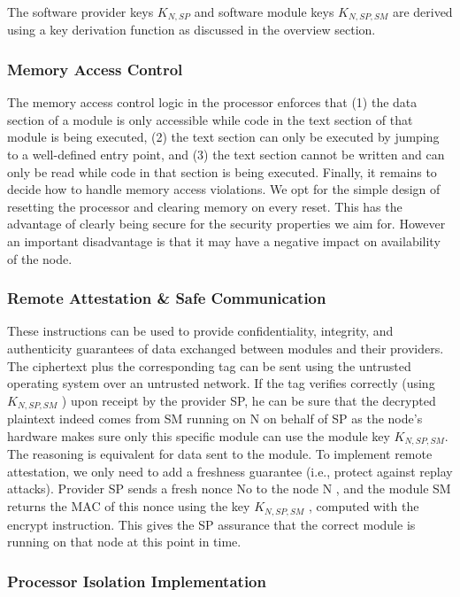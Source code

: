 \documentclass{article}
\begin{document}
The software provider keys $K_{N,SP}$ and software module keys $K_{N,SP,SM}$ are derived using a key derivation function as discussed in the overview section.

\subsubsection{Memory Access Control}

The memory access control logic in the processor enforces that (1) the data section of a module is only accessible while code in the text section of that module is being executed, (2) the text section can only be executed by jumping to a well-defined entry point, and (3) the text section cannot be written and can only be read while code in that section is being executed. Finally, it remains to decide how to handle memory access violations. We opt for the simple design of resetting the processor and clearing memory on every reset. This has the advantage of clearly being secure for the security properties we aim for. However an important disadvantage is that it may have a negative impact on availability of the node.

\subsubsection{Remote Attestation \& Safe Communication}

These instructions can be used to provide confidentiality, integrity, and authenticity guarantees of data exchanged between modules and their providers. The ciphertext plus the corresponding tag can be sent using the untrusted operating system over an untrusted network. If the tag verifies correctly (using $K_{N,SP,SM}$ ) upon receipt by the provider SP, he can be sure that the decrypted plaintext indeed comes from SM running on N on behalf of SP as the node’s hardware makes sure only this specific module can use the module key $K_{N,SP,SM}$. The reasoning is equivalent for data sent to the module. To implement remote attestation, we only need to add a freshness guarantee (i.e., protect against replay attacks). Provider SP sends a fresh nonce No to the node N , and the module SM returns the MAC of this nonce using the key $K_{N,SP,SM}$ , computed with the encrypt instruction. This gives the SP assurance that the correct module is running on that node at this point in time.

\subsubsection{Processor Isolation Implementation}
\end{document}
